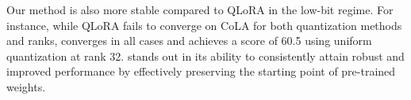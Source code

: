Our method is also more stable compared to QLoRA in the low-bit regime. For instance, while QLoRA fails to converge on CoLA for both quantization methods and ranks, {\OurAlg} converges in all cases and achieves a score of 60.5 using uniform quantization at rank 32. {\OurAlg} stands out in its ability to consistently attain robust and improved performance by effectively preserving the starting point of pre-trained weights.









